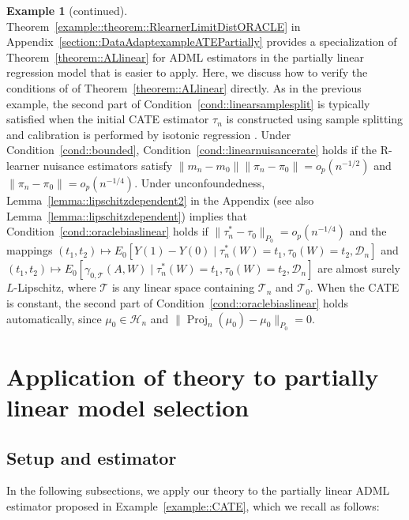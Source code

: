 \documentclass[11pt]{article}
\theoremstyle{definition}
\newtheorem{example}{Example}
\begin{document}
\begin{example}[continued]
Theorem~\ref{example::theorem::RlearnerLimitDistORACLE} in Appendix~\ref{section::DataAdaptexampleATEPartially} provides a specialization of Theorem~\ref{theorem::ALlinear} for ADML estimators in the partially linear regression model that is easier to apply. Here, we discuss how to verify the conditions of of Theorem~\ref{theorem::ALlinear} directly. As in the previous example, the second part of Condition~\ref{cond::linearsamplesplit} is typically satisfied when the initial CATE estimator \(\tau_n\) is constructed using sample splitting and calibration is performed by isotonic regression \citep{van2024automatic,klaassen2025calibration}. Under Condition~\ref{cond::bounded}, Condition~\ref{cond::linearnuisancerate} holds if the R-learner nuisance estimators satisfy \(\|m_n-m_0\|\|\pi_n-\pi_0\| = o_p(n^{-1/2})\) and \(\|\pi_n-\pi_0\| = o_p(n^{-1/4})\). Under unconfoundedness, Lemma~\ref{lemma::lipschitzdependent2} in the Appendix (see also Lemma~\ref{lemma::lipschitzdependent}) implies that Condition~\ref{cond::oraclebiaslinear} holds if \(\|\tau_n^*-\tau_0\|_{P_0} = o_p(n^{-1/4})\) and the mappings \((t_1,t_2) \mapsto E_0[Y(1)-Y(0)\mid \tau_n^*(W)=t_1,\tau_0(W)=t_2,\mathcal{D}_n]\) and \((t_1,t_2) \mapsto E_0[\gamma_{0,\mathcal{T}}(A,W)\mid \tau_n^*(W)=t_1,\tau_0(W)=t_2,\mathcal{D}_n]\) are almost surely \(L\)-Lipschitz, where \(\mathcal{T}\) is any linear space containing \(\mathcal{T}_n\) and \(\mathcal{T}_0\). When the CATE is constant, the second part of Condition~\ref{cond::oraclebiaslinear} holds automatically, since \(\mu_0 \in \mathcal{H}_n\) and \(\|\operatorname{Proj}_n(\mu_0)-\mu_0\|_{P_0}=0\).
\end{example}


 \section{Application of theory to partially linear model selection}
\label{appendix::PLM}

\subsection{Setup and estimator}


\label{app:ADMLpartiallylinear}
In the following subsections, we apply our theory to the partially linear ADML estimator proposed in Example~\ref{example::CATE}, which we recall as follows:
\end{document}
